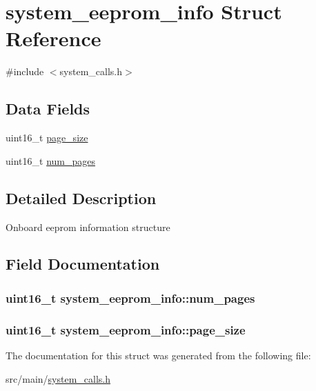 \hypertarget{structsystem__eeprom__info}{\section{system\+\_\+eeprom\+\_\+info Struct Reference}
\label{structsystem__eeprom__info}
}


{\ttfamily \#include $<$system\+\_\+calls.\+h$>$}

\subsection*{Data Fields}
\begin{DoxyCompactItemize}
\item 
uint16\+\_\+t \hyperlink{structsystem__eeprom__info_a890ed1f1ea67a7560ea48223e750206a}{page\+\_\+size}
\item 
uint16\+\_\+t \hyperlink{structsystem__eeprom__info_a52424b81731e8b527087c9935cfc646a}{num\+\_\+pages}
\end{DoxyCompactItemize}


\subsection{Detailed Description}
Onboard eeprom information structure 

\subsection{Field Documentation}
\hypertarget{structsystem__eeprom__info_a52424b81731e8b527087c9935cfc646a}{
\subsubsection[{num\+\_\+pages}]{\setlength{\rightskip}{0pt plus 5cm}uint16\+\_\+t system\+\_\+eeprom\+\_\+info\+::num\+\_\+pages}}\label{structsystem__eeprom__info_a52424b81731e8b527087c9935cfc646a}
\hypertarget{structsystem__eeprom__info_a890ed1f1ea67a7560ea48223e750206a}{
\subsubsection[{page\+\_\+size}]{\setlength{\rightskip}{0pt plus 5cm}uint16\+\_\+t system\+\_\+eeprom\+\_\+info\+::page\+\_\+size}}\label{structsystem__eeprom__info_a890ed1f1ea67a7560ea48223e750206a}


The documentation for this struct was generated from the following file\+:\begin{DoxyCompactItemize}
\item 
src/main/\hyperlink{system__calls_8h}{system\+\_\+calls.\+h}\end{DoxyCompactItemize}
